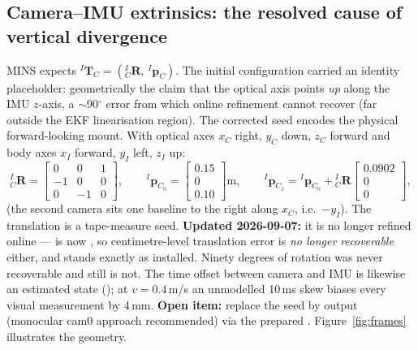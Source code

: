 \subsection{Camera--IMU extrinsics: the resolved cause of vertical divergence}
\label{sec:extrinsic}
MINS expects ${}^{I}\mathbf{T}_{C} = ({}^{I}_{C}\mathbf{R},\,
{}^{I}\mathbf{p}_{C})$. The initial configuration carried an identity
placeholder: geometrically the claim that the optical axis points
\emph{up} along the IMU $z$-axis, a $\sim$90$^\circ$ error from which online
refinement cannot recover (far outside the EKF linearisation region). The
corrected seed encodes the physical forward-looking mount. With optical axes
$x_C$ right, $y_C$ down, $z_C$ forward and body axes $x_I$ forward, $y_I$
left, $z_I$ up:
\begin{equation}
{}^{I}_{C}\mathbf{R} =
\begin{bmatrix} 0 & 0 & 1\\ -1 & 0 & 0\\ 0 & -1 & 0 \end{bmatrix},
\qquad
{}^{I}\mathbf{p}_{C_0} = \begin{bmatrix} 0.15\\ 0\\ 0.10 \end{bmatrix}\text{m},
\qquad
{}^{I}\mathbf{p}_{C_1} = {}^{I}\mathbf{p}_{C_0} +
{}^{I}_{C}\mathbf{R}\begin{bmatrix} 0.0902\\ 0\\ 0\end{bmatrix},
\label{eq:extr}
\end{equation}
(the second camera sits one baseline to the right along $x_C$, i.e.\ $-y_I$).
The translation is a tape-measure seed. \textbf{Updated 2026-09-07:} it is
no longer refined online ---  is now , so
centimetre-level translation error is \emph{no longer recoverable} either,
and stands exactly as installed. Ninety degrees of rotation was never
recoverable and still is not. The time offset between camera
and IMU is likewise an estimated state (); at
$v = 0.4$\,m/s an unmodelled 10\,ms skew biases every visual measurement by
4\,mm. \textbf{Open item:} replace the seed by
 output (monocular cam0 approach
recommended) via the prepared .
Figure~\ref{fig:frames} illustrates the geometry.

